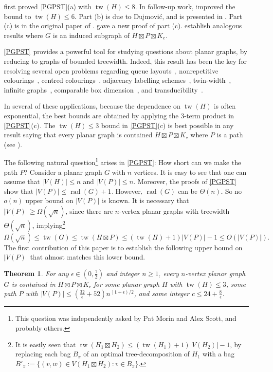 \documentclass[11pt]{article}
\renewcommand{\geq}{\geqslant}
\renewcommand{\leq}{\leqslant}
\newcommand{\StrongProd}{\mathbin{\boxtimes}}
\DeclareMathOperator{\tw}{tw}
\DeclareMathOperator{\rad}{rad}
\theoremstyle{plain}
\newtheorem{thm}{Theorem}
\theoremstyle{definition}
\begin{document}
	\citet{DJMMUW20} first proved \cref{PGPST}(a) with $\tw(H)\leq 8$. In follow-up work, \citet{UWY22} improved the bound to $\tw(H)\leq 6$. Part (b) is due to Dujmovi\'c, and is presented in \citep{UWY22}. Part (c) is in the original paper of  \citet{DJMMUW20}. \citet{ISW24} gave a new proof of part (c). \citet{HJ24} establish analogous results where $G$ is an induced subgraph of $H\boxtimes P\boxtimes K_c$. 
	
	\cref{PGPST} provides a powerful tool for studying questions about planar graphs, by reducing to graphs of bounded treewidth. Indeed, this result has been the key for resolving several open problems regarding queue layouts~\cite{DJMMUW20}, nonrepetitive colourings~\cite{DEJWW20}, centred colourings~\cite{DFMS21}, adjacency labelling schemes~\cite{GJ22,BGP22,EJM23,DEGJMM21}, twin-width~\cite{BDHK24,JP22,KPS24}, infinite graphs~\cite{HMSTW}, comparable box dimension~\cite{DGLTU22}, and transducibility~\citep{GPP,HJ25}. 
	
	In several of these applications, because the dependence on $\tw(H)$ is often exponential, the best bounds are obtained by applying the 3-term product in \cref{PGPST}(c). The $\tw(H)\leq 3$ bound in \cref{PGPST}(c) is best possible in any result saying that every planar graph is contained $H \StrongProd P \StrongProd K_c$ where $P$ is a path (see \citep{DJMMUW20}). 
	
	The following natural question\footnote{This question was independently asked by Pat Morin and Alex Scott, and probably others.} arises in \cref{PGPST}: How short can we make the path $P$? Consider a planar graph $G$ with $n$ vertices. It is easy to see that one can assume that $|V(H)|\leq n$ and $|V(P)|\leq n$. Moreover, the proofs of \cref{PGPST} show that $|V(P)|\leq\rad(G)+1$. However, $\rad(G)$ can be $\Theta(n)$. So no $o(n)$ upper bound on $|V(P)|$ is known. It is necessary that $|V(P)|\geq \Omega(\sqrt{n})$, since there are $n$-vertex planar graphs with treewidth $\Theta(\sqrt{n})$, implying\footnote{It is easily seen that 
		$\tw(H_1 \StrongProd H_2) \leq (\tw(H_1)+1)|V(H_2)|-1$, by replacing each bag $B_x$ of an optimal tree-decomposition of $H_1$ with a bag $B'_x:=\{(v,w)\in V(H_1\boxtimes H_2):v\in B_x\}$.%
        }  
	\[\Omega(\sqrt{n}) \leq \tw(G)\leq \tw(H\boxtimes P)\leq (\tw(H)+1)|V(P)|-1 \leq O(|V(P)|).\]
	The first contribution of this paper is to establish the following upper bound on $|V(P)|$ that almost matches this lower bound. 

	\begin{thm}
		\label{PGPST-sqrtn} 
		For any $\epsilon\in (0,\frac12)$ and integer $n\geq 1$, every $n$-vertex planar graph $G$ is contained in $H \StrongProd P \StrongProd K_c$ for some planar graph $H$ with $\tw(H)\leq 3$, some path $P$ with 
		$|V(P)|\leq (\frac{32}{\epsilon}+52) n^{(1+\epsilon)/2}$, and some integer $c\leq 24+\frac{8}{\epsilon}$.
	\end{thm}
	
\end{document}
